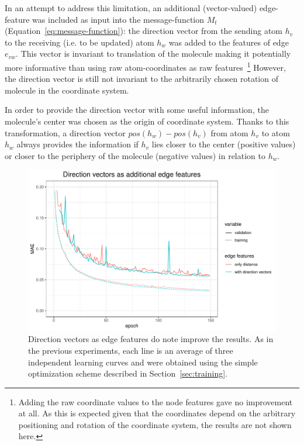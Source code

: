 In an attempt to address this limitation, an additional (vector-valued) edge-feature was included as input into the message-function $M_t$ (Equation~\ref{eq:message-function}): the direction vector from the sending atom $h_v$ to the receiving (i.e. to be updated) atom $h_w$ was added to the features of edge $e_{vw}$. This vector is invariant to translation of the molecule making it potentially more informative than using raw atom-coordinates as raw features~\footnote{Adding the raw coordinate values to the node features gave no improvement at all. As this is expected given that the coordinates depend on the arbitrary positioning and rotation of the coordinate system, the results are not shown here.} However, the direction vector is still not invariant to the arbitrarily chosen rotation of molecule in the coordinate system.

In order to provide the direction vector with some useful information, the molecule's center was chosen as the origin of coordinate system. Thanks to this transformation, a direction vector $pos(h_w) - pos(h_v)$ from atom $h_v$ to atom $h_w$ always provides the information if $h_v$ lies closer to the center (positive values) or closer to the periphery of the molecule (negative values) in relation to $h_w$.

\begin{figure}[H]
	\includegraphics[width=\linewidth]{figures/edge-direction-vectors}
	\caption{Direction vectors as edge features do note improve the results. As in the previous experiments, each line is an average of three independent learning curves and were obtained using the simple optimization scheme described in Section~\ref{sec:training}.}
	\label{fig:edge-direction-vectors}
\end{figure}

